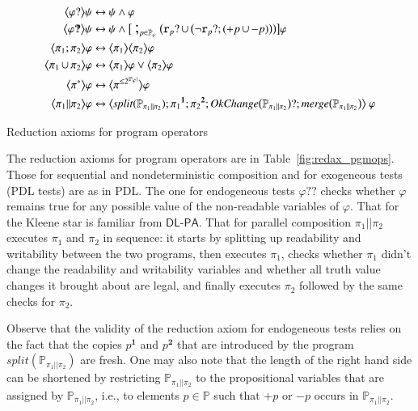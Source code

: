 \documentclass{llncs}
\newcommand{\atm}{x}
\newcommand{\cp}[2]{{#2}^\mathbf{#1}}
\newcommand{\pll}{ {||} }							%
\newcommand{\readable}[1]{\mathtt{r}_{#1}}
\newcommand{\testendo}{?\!\!?}			%
\newcommand{\testpdl}{?}				%
\newcommand{\Dlpa}{\ensuremath{\mathsf{DL\text{-}PA}}\xspace}
\newcommand{\assgntopV}[1]{{\mathtt {+} #1}}
\newcommand{\assgnbotV}[1]{{\mathtt {-} #1}}
\newcommand{\card}[1]{|#1|}
\newcommand{\lbox}[1]{ \big[ #1 \big] }
\newcommand{\ldia}[1]{ \big\langle #1 \big\rangle}
\newcommand{\leqv}{ \leftrightarrow }
\newcommand{\ndet}{\,{\cup}\,}
\renewcommand{\phi}{\varphi}
\newcommand{\propset}{\mathbb P}
\newcommand{\propsetOf}[1]{\propset_{#1}}
\newcommand{\seqseq}[1]{ \text{\Large ;}_{#1} ~ }
\begin{document}
\begin{table}[t]
\begin{align*}
\ldia{\phi \testpdl } \psi \leqv &\ \psi \land \phi
\\
\ldia{\phi \testendo } \psi \leqv &\ \psi \land \lbox{ ~ \seqseq{p \in \propsetOf \phi} \big(
\readable{p} \testpdl \ndet \big( \lnot \readable{p} \testpdl ; (\assgntopV{p} \ndet \assgnbotV{p}) \big) 
\big) } \phi
\\
\ldia{\pi_1 ; \pi_2}  \phi \leqv &\ \ldia{\pi_1 } \ldia{\pi_2}  \phi 
\\
\ldia{\pi_1 \ndet \pi_2}  \phi \leqv &\ \ldia{\pi_1 } \phi \lor \ldia{\pi_2}  \phi 
\\
\ldia{\pi^\ast}  \phi \leqv &\ \ldia{\pi^{\leq 2^{\card{\propsetOf{\phi}}}} }  \phi   
\\
\ldia{\pi_1 \pll \pi_2}  \phi \leqv &\ \ldia{ 
\mathit{split}( \propsetOf{\pi_1 \pll \pi_2} ) ; 
\cp 1 {\pi_1} ; \cp 2 {\pi_2} ; 
\mathit{OkChange} \big(\propsetOf{\pi_1 \pll \pi_2} \big) \testpdl ;
\mathit{merge} \big(\propsetOf{\pi_1 \pll \pi_2} \big)
} ~ \phi 
\end{align*}
\caption{Reduction axioms for program operators
\label{fig:redax_pgmops}
}
\end{table}

The reduction axioms for program operators are in Table~\ref{fig:redax_pgmops}.
Those for sequential and nondeterministic composition and for exogeneous tests (PDL tests) are as in PDL. 
The one for endogeneous tests $ \phi \testendo$ 
checks whether $\phi$ remains true for any possible value of the non-readable variables of $\phi$. 
That for the Kleene star is familiar from \Dlpa. 
That for parallel composition $\pi_1 \pll \pi_2$ executes $\pi_1$ and $\pi_2$ in sequence:
it starts by splitting up readability and writability between the two programs,
then executes $\pi_1$, checks whether $\pi_1$ didn't change the readability and writability variables
and whether all truth value changes it brought about are legal, 
and finally executes $\pi_2$ followed by the same checks for $\pi_2$.

Observe that the validity of the reduction axiom for endogeneous tests relies on the fact that the copies  
$\cp 1 p$ and $\cp 2 p$ that are introduced by the program 
$\mathit{split}( \propsetOf{\pi_1 \pll \pi_2} ) $ are fresh. 
%
%
One may also note that the length of the right hand side can be shortened by restricting 
$\propsetOf{\pi_1 \pll \pi_2}$ to the propositional variables that are assigned by $\propsetOf{\pi_1 \pll \pi_2}$, i.e., 
to elements $p \in \propset$ such that $\assgntopV p$ or $\assgnbotV p$ occurs in $\propsetOf{\pi_1 \pll \pi_2}$. 
\end{document}
